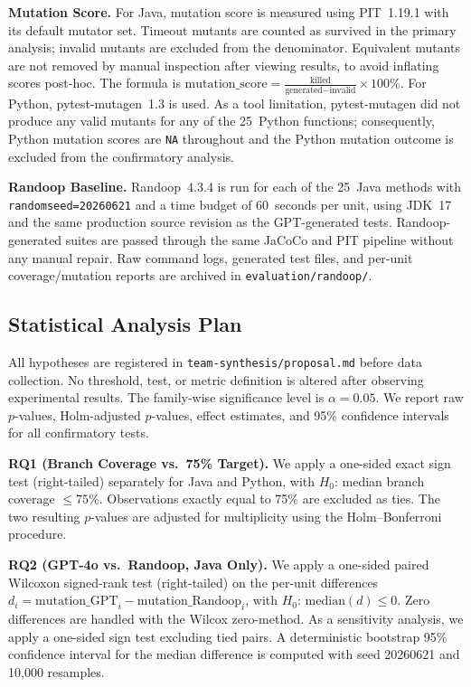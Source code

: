 \textbf{Mutation Score.}
For Java, mutation score is measured using PIT~1.19.1 with its default mutator
set.
Timeout mutants are counted as survived in the primary analysis; invalid mutants
are excluded from the denominator.
Equivalent mutants are not removed by manual inspection after viewing results, to
avoid inflating scores post-hoc.
The formula is
$\text{mutation\_score} = \frac{\text{killed}}{\text{generated} - \text{invalid}} \times 100\%$.
For Python, pytest-mutagen~1.3 is used.
As a tool limitation, pytest-mutagen did not produce any valid mutants for any
of the 25~Python functions; consequently, Python mutation scores are \texttt{NA}
throughout and the Python mutation outcome is excluded from the confirmatory
analysis.

\textbf{Randoop Baseline.}
Randoop~4.3.4 is run for each of the 25~Java methods with
\texttt{randomseed=20260621} and a time budget of 60~seconds per unit, using
JDK~17 and the same production source revision as the GPT-generated tests.
Randoop-generated suites are passed through the same JaCoCo and PIT pipeline
without any manual repair.
Raw command logs, generated test files, and per-unit coverage/mutation reports
are archived in \texttt{evaluation/randoop/}.

\subsection{Statistical Analysis Plan}
\label{subsec:statistics}

All hypotheses are registered in \texttt{team-synthesis/proposal.md} before data
collection.
No threshold, test, or metric definition is altered after observing experimental
results.
The family-wise significance level is $\alpha = 0.05$.
We report raw $p$-values, Holm-adjusted $p$-values, effect estimates, and 95\%
confidence intervals for all confirmatory tests.

\textbf{RQ1 (Branch Coverage vs.\ 75\% Target).}
We apply a one-sided exact sign test (right-tailed) separately for Java and
Python, with $H_0$: median branch coverage $\leq 75\%$.
Observations exactly equal to 75\% are excluded as ties.
The two resulting $p$-values are adjusted for multiplicity using the
Holm--Bonferroni procedure.

\textbf{RQ2 (GPT-4o vs.\ Randoop, Java Only).}
We apply a one-sided paired Wilcoxon signed-rank test (right-tailed) on the
per-unit differences $d_i = \text{mutation\_GPT}_i - \text{mutation\_Randoop}_i$,
with $H_0$: $\text{median}(d) \leq 0$.
Zero differences are handled with the Wilcox zero-method.
As a sensitivity analysis, we apply a one-sided sign test excluding tied pairs.
A deterministic bootstrap 95\% confidence interval for the median difference is
computed with seed 20260621 and 10,000 resamples.


